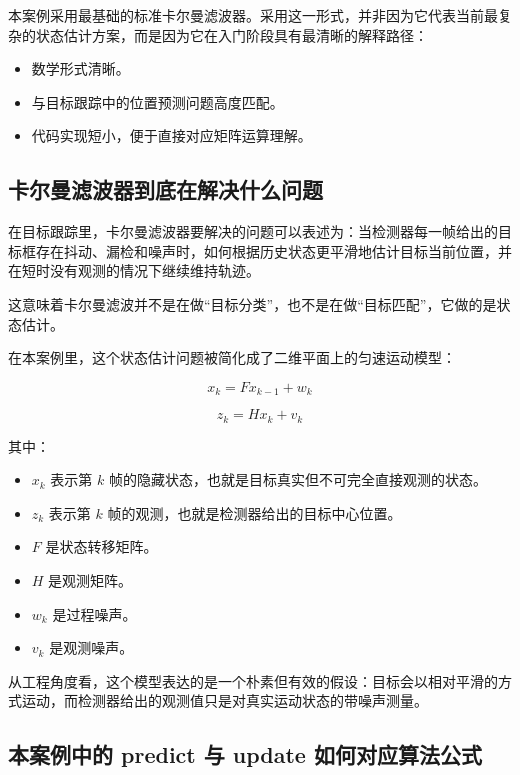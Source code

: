 本案例采用最基础的标准卡尔曼滤波器。采用这一形式，并非因为它代表当前最复杂的状态估计方案，而是因为它在入门阶段具有最清晰的解释路径：

\begin{itemize}
\tightlist
\item
  数学形式清晰。
\item
  与目标跟踪中的位置预测问题高度匹配。
\item
  代码实现短小，便于直接对应矩阵运算理解。
\end{itemize}

\subsection{卡尔曼滤波器到底在解决什么问题}\label{src-experiment-case2-h45}

在目标跟踪里，卡尔曼滤波器要解决的问题可以表述为：当检测器每一帧给出的目标框存在抖动、漏检和噪声时，如何根据历史状态更平滑地估计目标当前位置，并在短时没有观测的情况下继续维持轨迹。

这意味着卡尔曼滤波并不是在做``目标分类''，也不是在做``目标匹配''，它做的是状态估计。

在本案例里，这个状态估计问题被简化成了二维平面上的匀速运动模型：

\[
x_k = F x_{k-1} + w_k
\]

\[
z_k = H x_k + v_k
\]

其中：

\begin{itemize}
\tightlist
\item
  \(x_k\) 表示第 \(k\)
  帧的隐藏状态，也就是目标真实但不可完全直接观测的状态。
\item
  \(z_k\) 表示第 \(k\) 帧的观测，也就是检测器给出的目标中心位置。
\item
  \(F\) 是状态转移矩阵。
\item
  \(H\) 是观测矩阵。
\item
  \(w_k\) 是过程噪声。
\item
  \(v_k\) 是观测噪声。
\end{itemize}

从工程角度看，这个模型表达的是一个朴素但有效的假设：目标会以相对平滑的方式运动，而检测器给出的观测值只是对真实运动状态的带噪声测量。

\subsection{本案例中的 predict 与 update
如何对应算法公式}\label{src-experiment-case2-h46}

